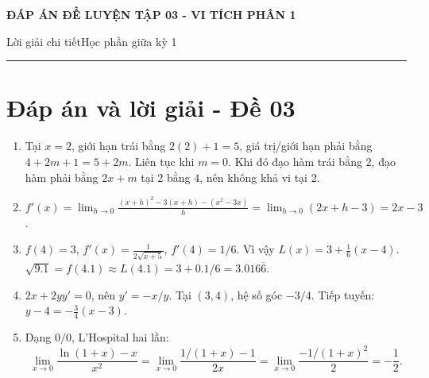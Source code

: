 \documentclass[11pt,a4paper]{article}
\newcommand{\examtitle}[4]{\begin{center}{\Large\bfseries\color{hcmusblue}#1}\par\vspace{3pt}{\large\bfseries #2}\par\vspace{3pt}\small #3\quad\textbullet\quad #4\end{center}\vspace{5pt}\hrule\vspace{8pt}}
\begin{document}
\examtitle{ĐÁP ÁN ĐỀ LUYỆN TẬP 03 - VI TÍCH PHÂN 1}{VI TÍCH PHÂN 1 - HCMUS (bộ luyện tập)}{Lời giải chi tiết}{Học phần giữa kỳ 1}

\section*{Đáp án và lời giải - Đề 03}
\begin{enumerate}
\item Tại $x=2$, giới hạn trái bằng $2(2)+1=5$, giá trị/giới hạn phải bằng $4+2m+1=5+2m$. Liên tục khi $m=0$. Khi đó đạo hàm trái bằng $2$, đạo hàm phải bằng $2x+m$ tại 2 bằng $4$, nên không khả vi tại 2.
\item $f'(x)=\lim_{h\to0}\frac{(x+h)^2-3(x+h)-(x^2-3x)}h=\lim_{h\to0}(2x+h-3)=2x-3$.
\item $f(4)=3$, $f'(x)=\frac1{2\sqrt{x+5}}$, $f'(4)=1/6$. Vì vậy $L(x)=3+\frac16(x-4)$. $\sqrt{9.1}=f(4.1)\approx L(4.1)=3+0.1/6=3.016\overline6$.
\item $2x+2yy'=0$, nên $y'=-x/y$. Tại $(3,4)$, hệ số góc $-3/4$. Tiếp tuyến: $y-4=-\frac34(x-3)$.
\item Dạng $0/0$, L'Hospital hai lần:
\[
\lim_{x\to0}\frac{\ln(1+x)-x}{x^2}=\lim_{x\to0}\frac{1/(1+x)-1}{2x}=\lim_{x\to0}\frac{-1/(1+x)^2}{2}=-\frac12.
\]
\end{enumerate}
\end{document}
